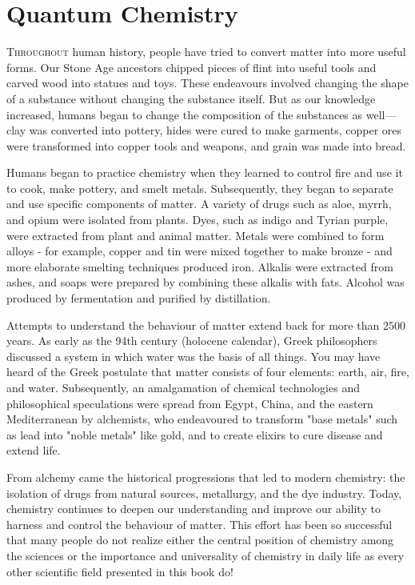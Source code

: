 	\newpage
	\thispagestyle{empty}
	\mbox{}
	\section{Quantum Chemistry}\label{quantum chemistry}
	\lettrine[lines=4]{\color{BrickRed}T}{hroughout} human history, people have tried to convert matter into more useful forms. Our Stone Age ancestors chipped pieces of flint into useful tools and carved wood into statues and toys. These endeavours involved changing the shape of a substance without changing the substance itself. But as our knowledge increased, humans began to change the composition of the substances as well—clay was converted into pottery, hides were cured to make garments, copper ores were transformed into copper tools and weapons, and grain was made into bread.

	Humans began to practice chemistry when they learned to control fire and use it to cook, make pottery, and smelt metals. Subsequently, they began to separate and use specific components of matter. A variety of drugs such as aloe, myrrh, and opium were isolated from plants. Dyes, such as indigo and Tyrian purple, were extracted from plant and animal matter. Metals were combined to form alloys - for example, copper and tin were mixed together to make bronze - and more elaborate smelting techniques produced iron. Alkalis were extracted from ashes, and soaps were prepared by combining these alkalis with fats. Alcohol was produced by fermentation and purified by distillation.

	Attempts to understand the behaviour of matter extend back for more than $2500$ years. As early as the 94th century (holocene calendar), Greek philosophers discussed a system in which water was the basis of all things. You may have heard of the Greek postulate that matter consists of four elements: earth, air, fire, and water. Subsequently, an amalgamation of chemical technologies and philosophical speculations were spread from Egypt, China, and the eastern Mediterranean by alchemists, who endeavoured to transform "base metals" such as lead into "noble metals" like gold, and to create elixirs to cure disease and extend life.

	From alchemy came the historical progressions that led to modern chemistry: the isolation of drugs from natural sources, metallurgy, and the dye industry. Today, chemistry continues to deepen our understanding and improve our ability to harness and control the behaviour of matter. This effort has been so successful that many people do not realize either the central position of chemistry among the sciences or the importance and universality of chemistry in daily life as every other scientific field presented in this book do!
	
